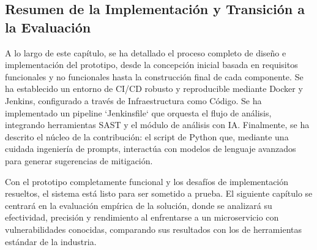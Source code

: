 \subsection{Resumen de la Implementación y Transición a la Evaluación}
A lo largo de este capítulo, se ha detallado el proceso completo de diseño e implementación del prototipo, desde la concepción inicial basada en requisitos funcionales y no funcionales hasta la construcción final de cada componente. Se ha establecido un entorno de CI/CD robusto y reproducible mediante Docker y Jenkins, configurado a través de Infraestructura como Código. Se ha implementado un pipeline `Jenkinsfile` que orquesta el flujo de análisis, integrando herramientas SAST y el módulo de análisis con IA. Finalmente, se ha descrito el núcleo de la contribución: el script de Python que, mediante una cuidada ingeniería de prompts, interactúa con modelos de lenguaje avanzados para generar sugerencias de mitigación.

Con el prototipo completamente funcional y los desafíos de implementación resueltos, el sistema está listo para ser sometido a prueba. El siguiente capítulo se centrará en la evaluación empírica de la solución, donde se analizará su efectividad, precisión y rendimiento al enfrentarse a un microservicio con vulnerabilidades conocidas, comparando sus resultados con los de herramientas estándar de la industria.

